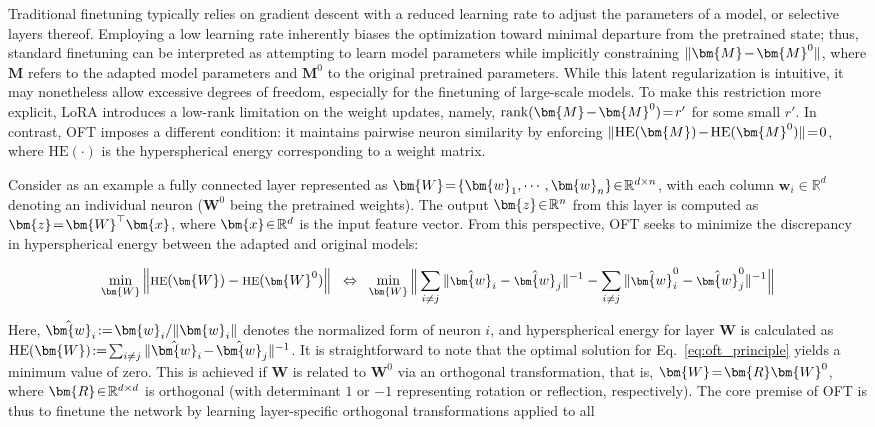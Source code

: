 Traditional finetuning typically relies on gradient descent with a reduced learning rate to adjust the parameters of a model, or selective layers thereof. Employing a low learning rate inherently biases the optimization toward minimal departure from the pretrained state; thus, standard finetuning can be interpreted as attempting to learn model parameters while implicitly constraining $\thickmuskip=2mu \medmuskip=2mu \| \bm{M} - \bm{M}^0\|$, where $\bm{M}$ refers to the adapted model parameters and $\bm{M}^0$ to the original pretrained parameters. While this latent regularization is intuitive, it may nonetheless allow excessive degrees of freedom, especially for the finetuning of large-scale models. To make this restriction more explicit, LoRA introduces a low-rank limitation on the weight updates, namely, $\thickmuskip=2mu \medmuskip=2mu \text{rank}(\bm{M} - \bm{M}^0)=r'$ for some small $r'$. In contrast, OFT imposes a different condition: it maintains pairwise neuron similarity by enforcing $\thickmuskip=2mu \medmuskip=2mu \| \text{HE}(\bm{M})-\text{HE}(\bm{M}^0) \|=0$, where $\text{HE}(\cdot)$ is the hyperspherical energy corresponding to a weight matrix.

Consider as an example a fully connected layer represented as $\thickmuskip=2mu \medmuskip=2mu \bm{W}=\{\bm{w}_1,\cdots,\bm{w}_n\}\in\mathbb{R}^{d\times n}$, with each column $\bm{w}_i\in\mathbb{R}^{d}$ denoting an individual neuron ($\bm{W}^0$ being the pretrained weights). The output $\thickmuskip=2mu \medmuskip=2mu \bm{z}\in\mathbb{R}^n$ from this layer is computed as $\thickmuskip=2mu \medmuskip=2mu \bm{z}=\bm{W}^\top\bm{x}$, where $\thickmuskip=2mu \medmuskip=2mu \bm{x}\in\mathbb{R}^d$ is the input feature vector. From this perspective, OFT seeks to minimize the discrepancy in hyperspherical energy between the adapted and original models:

\begin{equation}\label{eq:oft_principle}
\footnotesize
\min_{\bm{W}} \left\| \text{HE}(\bm{W})-\text{HE}(\bm{W}^0)\right\|~~\Leftrightarrow~~\min_{\bm{W}} \bigg{\|} \sum_{i\neq j} \|\hat{\bm{w}}_i-\hat{\bm{w}}_j\|^{-1}-\sum_{i\neq j} \|\hat{\bm{w}}^0_i-\hat{\bm{w}}^0_j\|^{-1}\bigg{\|}
\end{equation}

Here, $\thickmuskip=2mu \medmuskip=2mu \hat{\bm{w}}_i:=\bm{w}_i/\|\bm{w}_i\|$ denotes the normalized form of neuron $i$, and hyperspherical energy for layer $\bm{W}$ is calculated as $\thickmuskip=2mu \medmuskip=2mu \text{HE}(\bm{W}):= \sum_{i\neq j} \|\hat{\bm{w}}_i-\hat{\bm{w}}_j\|^{-1}$. It is straightforward to note that the optimal solution for Eq.~\eqref{eq:oft_principle} yields a minimum value of zero. This is achieved if $\bm{W}$ is related to $\bm{W}^0$ via an orthogonal transformation, that is, $\thickmuskip=2mu \medmuskip=2mu \bm{W}=\bm{R}\bm{W}^0$, where $\thickmuskip=2mu \medmuskip=2mu \bm{R}\in\mathbb{R}^{d\times d}$ is orthogonal (with determinant $1$ or $-1$ representing rotation or reflection, respectively). The core premise of OFT is thus to finetune the network by learning layer-specific orthogonal transformations applied to all

